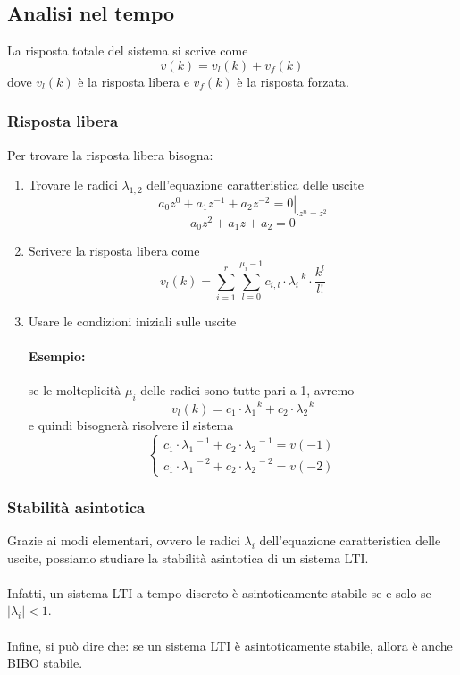 \documentclass[a4paper]{article}
\begin{document}
	\subsection{Analisi nel tempo}
	La risposta totale del sistema si scrive come
	\[ v(k) = v_l(k) + v_f(k) \]
	dove $v_l(k)$ è la risposta libera e $v_f(k)$ è la risposta forzata.

	\subsubsection{Risposta libera}
	Per trovare la risposta libera bisogna:
	
	\begin{enumerate}
		\item Trovare le radici $\lambda_{1,2}$ dell'equazione caratteristica delle uscite
			\[ \left. a_0 z^0 + a_1 z^{-1} + a_2 z^{-2} = 0 \right|_{\cdot z^n = z^2} \]
			\[ a_0 z^2 + a_1 z + a_2 = 0 \]
		\item Scrivere la risposta libera come
			\[
			v_l(k) = \sum_{i=1}^r \sum_{l=0}^{\mu_i-1} c_{i,l} \cdot \lambda^{\text{ }k}_i \cdot \frac{k^l}{l!}
			\]
		\item Usare le condizioni iniziali sulle uscite
			\paragraph{Esempio:}
			se le molteplicità $\mu_i$ delle radici sono tutte pari a 1, avremo
			\[ v_l(k) = c_1 \cdot \lambda^{\text{ }k}_1 + c_2 \cdot \lambda^{\text{ }k}_2 \]
			e quindi bisognerà risolvere il sistema
			\[ \begin{cases}
				c_1 \cdot \lambda^{\text{ }-1}_1 + c_2 \cdot \lambda^{\text{ }-1}_2 = v(-1) \\
				c_1 \cdot \lambda^{\text{ }-2}_1 + c_2 \cdot \lambda^{\text{ }-2}_2 = v(-2)
			\end{cases} \]
	\end{enumerate}
	
	\subsubsection{Stabilità asintotica}
	Grazie ai modi elementari, ovvero le radici $\lambda_i$ dell'equazione caratteristica delle uscite, possiamo studiare la stabilità asintotica di un sistema LTI.
	\\ \\
	Infatti, un sistema LTI a tempo discreto è asintoticamente stabile se e solo se $|\lambda_i|<1$.
	\\ \\
	Infine, si può dire che: se un sistema LTI è asintoticamente stabile, allora è anche BIBO stabile.
	
\end{document}
